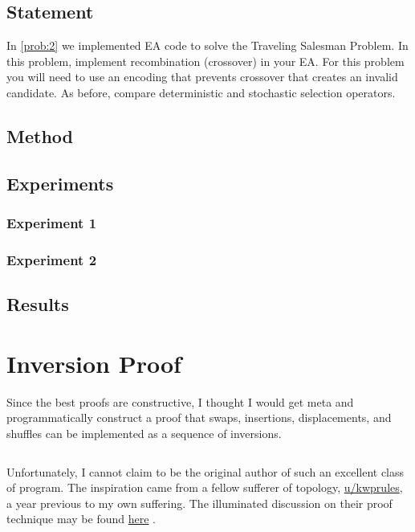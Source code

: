 \documentclass{article}
\begin{document}
\subsection{Statement}
In \autoref{prob:2} we implemented EA code to solve the Traveling Salesman Problem. In this
problem, implement recombination (crossover) in your EA. For this problem you will need to use an
encoding that prevents crossover that creates an invalid candidate. As before, compare
deterministic and stochastic selection operators.

\subsection{Method}

\subsection{Experiments}

\subsubsection{Experiment 1}
\subsubsection{Experiment 2}

\subsection{Results}

\appendix\appendixpage{}\addappheadtotoc{}
\section{Inversion Proof}\label{app:proof}

Since the best proofs are constructive, I thought I would get meta and programmatically construct a
proof that swaps, insertions, displacements, and shuffles can be implemented as a sequence of
inversions.

\inputminted{python}{proof.py}

Unfortunately, I cannot claim to be the original author of such an excellent class of program. The
inspiration came from a fellow sufferer of topology,
\textcolor{blue}{\href{https://www.reddit.com/user/kwprules}{u/kwprules}}, a year previous to my
own suffering. The illuminated discussion on their proof technique may be found
\textcolor{blue}
{\href{https://www.reddit.com/r/math/comments/7gqhlc/what\_to\_say\_instead\_of\_trivially/}{here}}
.


{}
\end{document}
